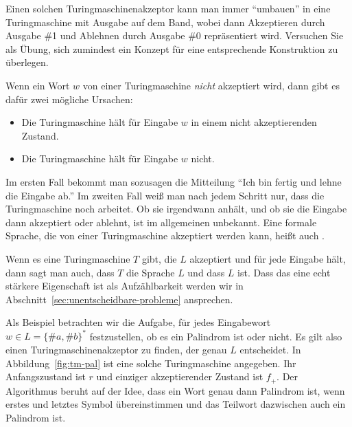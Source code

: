 Einen solchen Turingmaschinenakzeptor kann man immer "`umbauen"' in
eine Turingmaschine mit Ausgabe auf dem Band, wobei dann Akzeptieren
durch Ausgabe \#1 und Ablehnen durch Ausgabe \#0 repräsentiert wird.
Versuchen Sie als Übung, sich zumindest ein Konzept für eine
entsprechende Konstruktion zu überlegen.

Wenn ein Wort $w$ von einer Turingmaschine \emph{nicht} akzeptiert wird,
dann gibt es dafür zwei mögliche Ursachen:
\begin{itemize}
\item Die Turingmaschine hält für Eingabe $w$ in einem nicht
  akzeptierenden Zustand.
\item Die Turingmaschine hält für Eingabe $w$ nicht.
\end{itemize}
%
Im ersten Fall bekommt man sozusagen die Mitteilung "`Ich bin fertig
und lehne die Eingabe ab."' Im zweiten Fall weiß man nach jedem
Schritt nur, dass die Turingmaschine noch arbeitet. Ob sie irgendwann
anhält, und ob sie die Eingabe dann akzeptiert oder ablehnt, ist im
allgemeinen unbekannt. Eine formale Sprache, die von einer
Turingmaschine akzeptiert werden kann, heißt auch .

Wenn es eine Turingmaschine $T$ gibt, die $L$ akzeptiert und für jede
Eingabe hält, dann sagt man auch, dass $T$ die Sprache $L$
 und dass $L$  ist. Dass das eine echt
stärkere Eigenschaft ist als Aufzählbarkeit werden wir in
Abschnitt~\ref{sec:unentscheidbare-probleme} ansprechen.

Als Beispiel betrachten wir die Aufgabe, für jedes Eingabewort $w\in
L=\{\#a,\#b\}^*$ festzustellen, ob es ein Palindrom ist oder nicht.
Es gilt also einen Turingmaschinenakzeptor zu finden, der genau $L$
entscheidet. In Abbildung~\ref{fig:tm-pal} ist eine solche
Turingmaschine angegeben. Ihr Anfangszustand ist $r$ und einziger
akzeptierender Zustand ist $f_+$. Der Algorithmus beruht auf der Idee,
dass ein Wort genau dann Palindrom ist, wenn erstes und letztes Symbol
übereinstimmen und das Teilwort dazwischen auch ein Palindrom ist.

